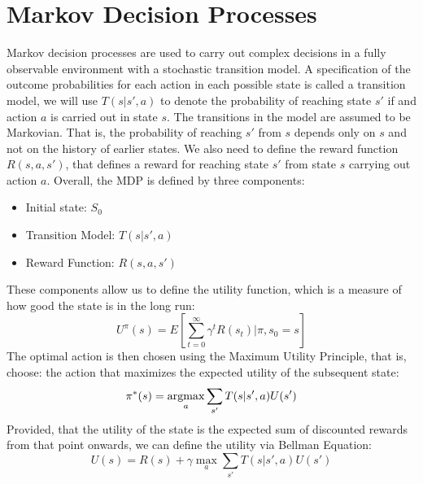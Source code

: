     \section{Markov Decision Processes}\label{sec:markov_descision_processes}
        Markov decision processes are used to carry out complex decisions in a fully
        observable environment with a stochastic transition model.
        A specification of the outcome probabilities for each action in each possible state is
        called a transition model, we will use $T(s| s', a)$ to denote the
        probability of reaching state $s'$ if and action $a$ is carried out in state
        $s$.
        The transitions in the model are assumed to be Markovian. That is, the probability of
        reaching $s'$ from $s$ depends only on $s$ and not on the history of earlier
        states.
        We also need to define the reward function $R(s, a, s')$, that defines a reward
        for reaching state $s'$ from state $s$ carrying out action $a$.
        Overall, the MDP is defined by three components:
        \begin{itemize}
            \item Initial state: $S_0$
            \item Transition Model: $T(s| s', a)$
            \item Reward Function: $R(s, a, s')$
        \end{itemize}
        These components allow us to define the utility function, which is a measure of
        how good the state is in the long run:
        \begin{equation}
        U^{\pi}(s) = E\left[\sum_{t=0}^{\infty} \gamma^t R(s_t) | \pi,s_0 = s \right]
        \end{equation}
        The optimal action is then chosen using the Maximum Utility Principle, that is,
        choose: the action that maximizes the expected utility of the subsequent state:
        \begin{equation}
        \label{lbl:optimal_policy}
        \pi^*(s) = \mathop{\rm argmax}_a \sum_{s'} T(s| s', a)U(s')
        \end{equation}
        Provided, that the utility of the state is the expected sum of discounted
        rewards from that point onwards, we can define the utility via Bellman Equation:
        \begin{equation}
        \label{lbl:bellman_equation}
            U(s) = R(s) + \gamma \max_a \sum_{s'}T(s| s', a)U(s')
        \end{equation}
